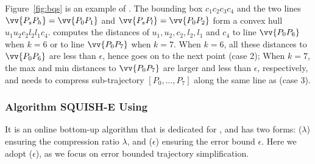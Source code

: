 \begin{example}
	\label{exm-alg-bqs}
	Figure~\ref{fig:bqs} is an example of \bqsa. The bounding box $c_1c_2c_3c_4$ and the two lines $\vv{P_sP_{h}} = \vv{P_0P_1}$ and $\vv{P_sP_{l}} = \vv{P_0P_2}$ form a convex hull $u_1u_2c_2l_2l_1c_4$. \bqsa computes the distances of $u_1,u_2,c_2,l_2,l_1$ and $c_4$ to line $\vv{P_0P_6}$ when $k=6$ or to line $\vv{P_0P_7}$ when $k=7$.
	When $k=6$, all these distances to $\vv{P_0P_6}$  are less than $\epsilon$, hence \bqsa goes on to the next point (case 2); When $k=7$,
	the max and min distances to $\vv{P_0P_7}$ are larger and less than $\epsilon$, respectively, and \bqsa needs to compress sub-trajectory $[P_0, \ldots, P_7]$ along the same line as \dpa (case 3).
\end{example}




\subsubsection{Algorithm SQUISH-E Using \sed~\cite{Muckell:Compression}}
It is an online bottom-up algorithm that is {dedicated for \sed}, and has two forms: \squishe($\lambda$) ensuring the compression ratio $\lambda$, and \squishe($\epsilon$) ensuring the \sed error bound $\epsilon$. Here we adopt \squishe($\epsilon$), as we focus on error bounded trajectory simplification.


